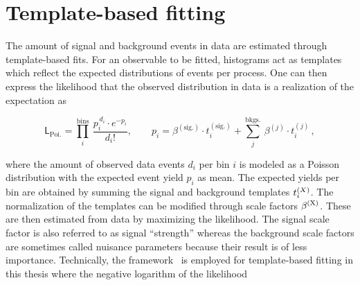 

\section{Template-based fitting}

The amount of signal and background events in data are estimated through template-based  fits. For an observable to be fitted, histograms act as templates which reflect the expected distributions of events per process. One can then express the likelihood that the observed distribution in data is a realization of the  expectation as

\begin{equation}
\mathsf{L}_\mathrm{Poi.}=\prod_{i}^\mathrm{bins}~\frac{p_{i}^{\,d_{i}}\cdot e^{-p_{i}}}{d_{i}!},\qquad p_{i}=\beta^{\mathrm{(sig.)}}\cdot t^{\mathrm{(sig.)}}_{i}+\sum_{j}^\mathrm{bkgs.}~\beta^{(j)}\cdot t^{(j)}_{i} \,, \label{eq:technique-likelihood}
\end{equation}

where the amount of observed data events $d_{i}$ per bin $i$ is modeled as a Poisson distribution with the expected event yield $p_{i}$ as mean. The expected yields per bin are obtained by summing the signal and background templates $t^\scriptn{(X)}_{i}$. The normalization of the templates can be modified through scale factors $\beta^\scriptn{\mathrm{(X)}}$. These are then estimated from data by maximizing the likelihood. The signal scale factor is also referred to as signal ``strength'' whereas the background scale factors are sometimes called nuisance parameters because their result is of less importance. Technically, the \THETA[format=hyperbf] framework~\cite{theta} is employed for template-based fitting in this thesis where the negative logarithm of the likelihood

